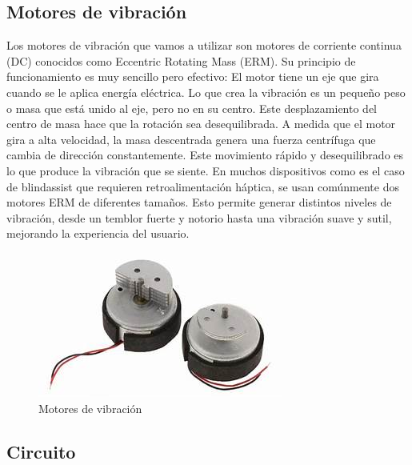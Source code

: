 \documentclass[12pt,a4paper]{article}
\begin{document}
\subsection{Motores de vibración}
Los motores de vibración que vamos a utilizar son motores de corriente continua (DC) conocidos como Eccentric Rotating Mass (ERM). Su principio de funcionamiento es muy sencillo pero efectivo: El motor tiene un eje que gira cuando se le aplica energía eléctrica. Lo que crea la vibración es un pequeño peso o masa que está unido al eje, pero no en su centro. Este desplazamiento del centro de masa hace que la rotación sea desequilibrada. A medida que el motor gira a alta velocidad, la masa descentrada genera una fuerza centrífuga que cambia de dirección constantemente. Este movimiento rápido y desequilibrado es lo que produce la vibración que se siente. En muchos dispositivos como es el caso de blindassist que requieren retroalimentación háptica, se usan comúnmente dos motores ERM de diferentes tamaños. Esto permite generar distintos niveles de vibración, desde un temblor fuerte y notorio hasta una vibración suave y sutil, mejorando la experiencia del usuario.

\begin{figure}[H]
    \centering
    \includegraphics[width=0.5\linewidth]{Carpeta tecnica/Motores.png}
    \caption{Motores de vibración}
\end{figure}

\subsection{Circuito}
\end{document}
